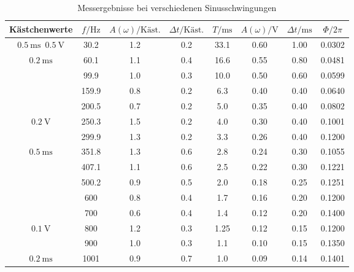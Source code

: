 \begin{table}
    \caption{Messergebnisse bei verschiedenen Sinusschwingungen}
    \label{tab:RC_b_c}
    \centering
    \begin{tabular}{
        c
        S[table-format=3.1]
        S
        S
        S[table-format=2.2]
        S[table-format=1.2]
        S[table-format=1.2]
        S[table-format=1.4]
    }
    \toprule
    {Kästchenwerte} & 
    {$f / \unit{\hertz}$} &
    {$A(\omega) / \text{Käst.}$} &
    {$\Delta t / \text{Käst.}$} &
    {$T / \unit{\milli\s}$} &
    {$A(\omega) / \unit{\volt} $} & 
    {$\Delta t / \unit{\milli\s}$} &
    {$\Phi / 2 \pi$}\\
    \midrule
           
    $\qty{0.5}{\milli\s}$\, $\qty{0.5}{\volt} $ & 30.2  & 1.2 & 0.2  & 33.1 & 0.60 & 1.00 & 0.0302 \\
    $\qty{0.2}{\milli\s}$                       & 60.1  & 1.1 & 0.4  & 16.6 & 0.55 & 0.80 & 0.0481 \\
                                                & 99.9  & 1.0 & 0.3  & 10.0 & 0.50 & 0.60 & 0.0599 \\
                                                & 159.9 & 0.8 & 0.2  & 6.3  & 0.40 & 0.40 & 0.0640 \\
                                                & 200.5 & 0.7 & 0.2  & 5.0  & 0.35 & 0.40 & 0.0802 \\
    $\qty{0.2}{\volt}$                          & 250.3 & 1.5 & 0.2  & 4.0  & 0.30 & 0.40 & 0.1001 \\
                                                & 299.9 & 1.3 & 0.2  & 3.3  & 0.26 & 0.40 & 0.1200 \\
    $\qty{0.5}{\milli\s}$                       & 351.8 & 1.3 & 0.6  & 2.8  & 0.24 & 0.30 & 0.1055 \\
                                                & 407.1 & 1.1 & 0.6  & 2.5  & 0.22 & 0.30 & 0.1221 \\
                                                & 500.2 & 0.9 & 0.5  & 2.0  & 0.18 & 0.25 & 0.1251 \\
                                                & 600   & 0.8 & 0.4  & 1.7  & 0.16 & 0.20 & 0.1200 \\
                                                & 700   & 0.6 & 0.4  & 1.4  & 0.12 & 0.20 & 0.1400 \\
    $\qty{0.1}{\volt}$                          & 800   & 1.2 & 0.3  & 1.25 & 0.12 & 0.15 & 0.1200 \\
                                                & 900   & 1.0 & 0.3  & 1.1  & 0.10 & 0.15 & 0.1350 \\
    $\qty{0.2}{\milli\s}$                       & 1001  & 0.9 & 0.7  & 1.0  & 0.09 & 0.14 & 0.1401 \\
    \bottomrule
    \end{tabular}
\end{table}